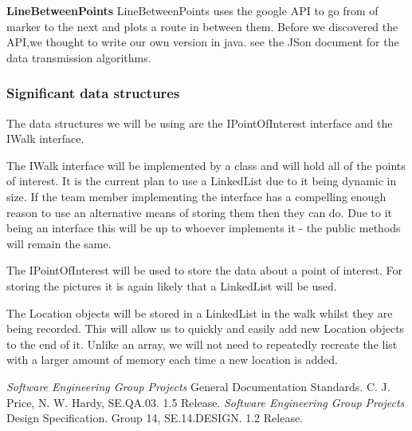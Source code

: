 \documentclass{project}
\begin{document}
\textbf{LineBetweenPoints}
LineBetweenPoints uses the google API to go from of marker to the next and plots a route in between them. Before we discovered the API,we thought to write our own version in java. 
see the JSon document for the data transmission algorithms.


\subsubsection{Significant data structures}
The data structures we will be using are the IPointOfInterest interface and the
IWalk interface.

The IWalk interface will be implemented by a class and will hold all of the
points of interest. It is the current plan to use a LinkedList due to it being
dynamic in size. If the team member implementing the interface has a compelling
enough reason to use an alternative means of storing them then they can do. Due
to it being an interface this will be up to whoever implements it - the public
methods will remain the same.

The IPointOfInterest will be used to store the data about a point of interest.
For storing the pictures it is again likely that a LinkedList will be used.

The Location objects will be stored in a LinkedList in the walk
whilst they are being recorded. This will allow us to quickly and easily add
new Location objects to the end of it. Unlike an array, we will not need to
repeatedly recreate the list with a larger amount of memory each time a new
location is added.


\clearpage

\begin{thebibliography}{5}
 \emph{Software Engineering Group Projects}
General Documentation Standards.
C. J. Price, N. W. Hardy, SE.QA.03. 1.5 Release.
 \emph{Software Engineering Group Projects}
Design Specification.
Group 14, SE.14.DESIGN. 1.2 Release.
\end{thebibliography}
\end{document}
